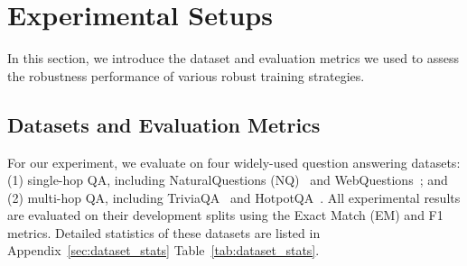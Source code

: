 \section{Experimental Setups}
In this section, we introduce the dataset and evaluation metrics we used to assess the robustness performance of various robust training strategies.
\subsection{Datasets and Evaluation Metrics}
For our experiment, we evaluate on four widely-used question answering datasets: (1) single-hop QA, including NaturalQuestions (NQ)~\cite{kwiatkowski-etal-2019-natural} and WebQuestions~\cite{berant-etal-2013-semantic}; and (2) multi-hop QA, including TriviaQA~\cite{joshi-etal-2017-triviaqa} and HotpotQA~\cite{yang-etal-2018-hotpotqa}. All experimental results are evaluated on their development splits using the Exact Match (EM) and F1 metrics. Detailed statistics of these datasets are listed in Appendix~\ref{sec:dataset_stats} Table~\ref{tab:dataset_stats}.




